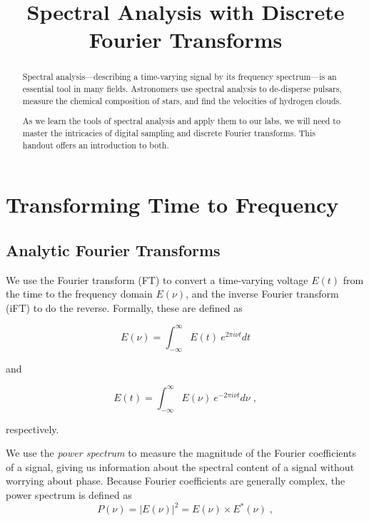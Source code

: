 \documentclass[11pt,preprint]{aastex}
\begin{document}
\title{Spectral Analysis with Discrete Fourier Transforms}


\begin{abstract}
Spectral analysis---describing a time-varying signal
by its 
frequency spectrum---is an essential tool in many fields.
Astronomers use spectral analysis to de-disperse pulsars,
measure the chemical composition of stars, and find the velocities of hydrogen clouds. 

As we learn the tools of spectral analysis and apply them to our labs, we
will need to master the intricacies of digital sampling and discrete Fourier
transforms.  This handout offers an introduction to both.
\end{abstract}

\tableofcontents

\section{Transforming Time to Frequency}

\subsection{Analytic Fourier Transforms}

\noindent
We use the Fourier transform (FT) to convert a time-varying
voltage $E(t)$ from the time to the frequency domain $E(\nu)$, and 
the inverse Fourier transform (iFT) to do the reverse.
Formally, these are defined as

\begin{equation}
\label{eqone}
E(\nu) = \int_{-\infty}^{\infty}{E(t)\ e^{2 \pi i \nu t}  dt}
\end{equation}

\noindent
and 

\begin{equation}
 \label{eqoneb}
E(t) = \int_{-\infty}^{\infty} E(\nu)\ e^{-2 \pi i \nu t}  d\nu \; ,
\end{equation}

\noindent
respectively.

We use the {\it power spectrum} to measure the
magnitude of the Fourier coefficients of a signal, giving us information
about the spectral content of a signal without worrying about phase.   
Because Fourier coefficients are generally complex, the power spectrum
is defined as
\begin{equation}
P(\nu ) = \left|E(\nu)\right|^2 = E(\nu ) \times E^*(\nu ) \; ,
\end{equation}
\end{document}
